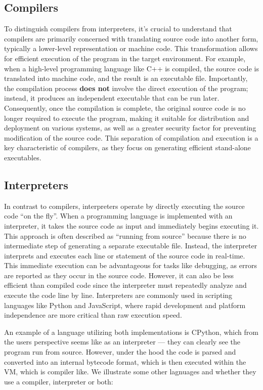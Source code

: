 {\subsection{Compilers}

To distinguish compilers from interpreters, it's crucial to understand that compilers are primarily concerned with translating source code into another form, typically a lower-level representation or machine code. This transformation allows for efficient execution of the program in the target environment. For example, when a high-level programming language like C++ is compiled, the source code is translated into machine code, and the result is an executable file. Importantly, the compilation process \textbf{does not} involve the direct execution of the program; instead, it produces an independent executable that can be run later. Consequently, once the compilation is complete, the original source code is no longer required to execute the program, making it suitable for distribution and deployment on various systems, as well as a greater security factor for preventing modification of the source code. This separation of compilation and execution is a key characteristic of compilers, as they focus on generating efficient stand-alone executables.

\subsection{Interpreters}

In contrast to compilers, interpreters operate by directly executing the source code ``on the fly''. When a programming language is implemented with an interpreter, it takes the source code as input and immediately begins executing it. This approach is often described as ``running from source'' because there is no intermediate step of generating a separate executable file. Instead, the interpreter interprets and executes each line or statement of the source code in real-time. This immediate execution can be advantageous for tasks like debugging, as errors are reported as they occur in the source code. However, it can also be less efficient than compiled code since the interpreter must repeatedly analyze and execute the code line by line. Interpreters are commonly used in scripting languages like Python and JavaScript, where rapid development and platform independence are more critical than raw execution speed.

An example of a language utilizing both implementations is CPython, which from the users perspective seems like as an interpreter — they can clearly see the program run from source. However, under the hood the code is parsed and converted into an internal bytecode format, which is then executed within the \ac{VM}, which is compiler like. We illustrate some other lagnuages and whether they use a compiler, interpreter or both:

}
